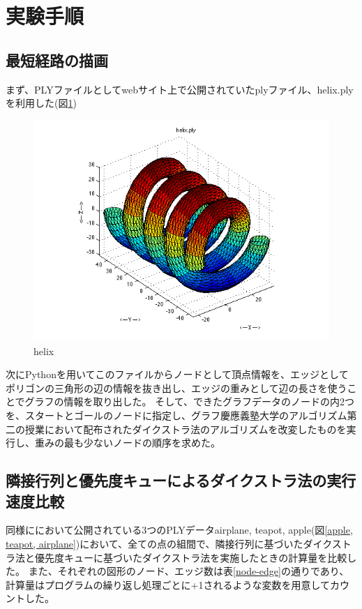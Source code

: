 \documentclass[a4paper,11pt]{jsarticle}
\begin{document}
\section{実験手順}

\subsection{最短経路の描画}

まず、PLYファイルとしてwebサイト上で公開されていたplyファイル、helix.plyを利用した(図\ref{helix})

\begin{figure}[H]
  \centering
  \includegraphics[scale = 0.5]{../Figs/helix.png} 
  \caption{helix}
  \label{helix}
\end{figure}

次にPythonを用いてこのファイルからノードとして頂点情報を、エッジとしてポリゴンの三角形の辺の情報を抜き出し、エッジの重みとして辺の長さを使うことでグラフの情報を取り出した。
そして、できたグラフデータのノードの内2つを、スタートとゴールのノードに指定し、グラフ慶應義塾大学のアルゴリズム第二の授業において配布されたダイクストラ法のアルゴリズムを改変したものを実行し、重みの最も少ないノードの順序を求めた。

\subsection{隣接行列と優先度キューによるダイクストラ法の実行速度比較}

同様に\cite{fsu}において公開されている3つのPLYデータairplane, teapot, apple(図\ref{apple, teapot, airplane})において、全ての点の組間で、隣接行列に基づいたダイクストラ法と優先度キューに基づいたダイクストラ法を実施したときの計算量を比較した。
また、それぞれの図形のノード、エッジ数は表\ref{node-edge}の通りであり、計算量はプログラムの繰り返し処理ごとに+1されるような変数を用意してカウントした。
\end{document}

